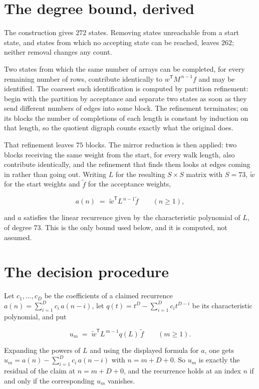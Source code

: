 \documentclass[11pt]{article}
\theoremstyle{definition}
\begin{document}
\section{The degree bound, derived}

The construction gives $272$ states. Removing states unreachable from a start state, and states from which no accepting state can be reached, leaves $262$; neither removal changes any count.

Two states from which the same number of arrays can be completed, for every remaining number of rows, contribute identically to $w^{\mathsf T}M^{\,n-1}f$ and may be identified. The coarsest such identification is computed by partition refinement: begin with the partition by acceptance and separate two states as soon as they send different numbers of edges into some block. The refinement terminates; on its blocks the number of completions of each length is constant by induction on that length, so the quotient digraph counts exactly what the original does.

That refinement leaves $75$ blocks. The mirror reduction is then applied: two blocks receiving the same weight from the start, for every walk length, also contribute identically, and the refinement that finds them looks at edges coming in rather than going out. Writing $L$ for the resulting $S \times S$ matrix with $S = 73$, $\tilde w$ for the start weights and $\tilde f$ for the acceptance weights,

\[a(n) \;=\; \tilde w^{\mathsf T} L^{\,n-1} \tilde f \qquad (n \ge 1),\]

and $a$ satisfies the linear recurrence given by the characteristic polynomial of $L$, of degree $73$. This is the only bound used below, and it is computed, not assumed.

\section{The decision procedure}

Let $c_1,\dots,c_D$ be the coefficients of a claimed recurrence $a(n) = \sum_{i=1}^{D} c_i\,a(n-i)$, let $q(t) = t^{D} - \sum_{i=1}^{D} c_i t^{D-i}$ be its characteristic polynomial, and put

\[u_m \;=\; \tilde w^{\mathsf T} L^{\,m-1} q(L)\,\tilde f \qquad (m \ge 1).\]

Expanding the powers of $L$ and using the displayed formula for $a$, one gets $u_m = a(n) - \sum_{i=1}^{D} c_i\,a(n-i)$ with $n = m + D + 0$. So $u_m$ is exactly the residual of the claim at $n = m + D + 0$, and the recurrence holds at an index $n$ if and only if the corresponding $u_m$ vanishes.
\end{document}
